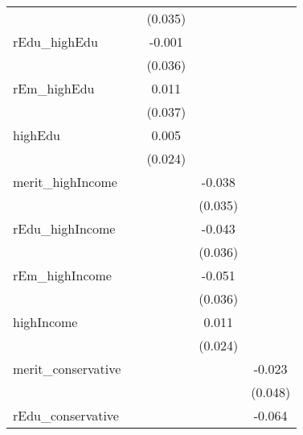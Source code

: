 {\begin{tabular}{l*{4}{c}}
            &                     &     (0.035)         &                     &                     \\
\addlinespace
rEdu\_highEdu&                     &      -0.001         &                     &                     \\
            &                     &     (0.036)         &                     &                     \\
\addlinespace
rEm\_highEdu &                     &       0.011         &                     &                     \\
            &                     &     (0.037)         &                     &                     \\
\addlinespace
highEdu     &                     &       0.005         &                     &                     \\
            &                     &     (0.024)         &                     &                     \\
\addlinespace
merit\_highIncome&                     &                     &      -0.038         &                     \\
            &                     &                     &     (0.035)         &                     \\
\addlinespace
rEdu\_highIncome&                     &                     &      -0.043         &                     \\
            &                     &                     &     (0.036)         &                     \\
\addlinespace
rEm\_highIncome&                     &                     &      -0.051         &                     \\
            &                     &                     &     (0.036)         &                     \\
\addlinespace
highIncome  &                     &                     &       0.011         &                     \\
            &                     &                     &     (0.024)         &                     \\
\addlinespace
merit\_conservative&                     &                     &                     &      -0.023         \\
            &                     &                     &                     &     (0.048)         \\
\addlinespace
rEdu\_conservative&                     &                     &                     &      -0.064         \\

\end{tabular}}
